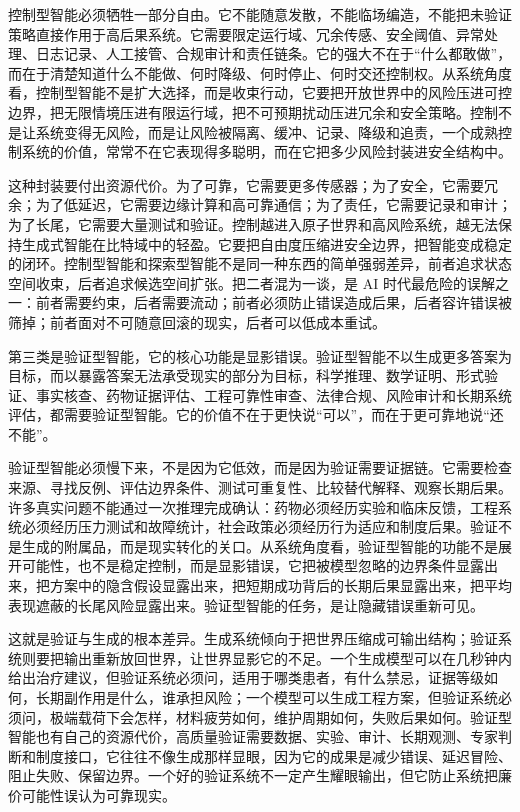 控制型智能必须牺牲一部分自由。它不能随意发散，不能临场编造，不能把未验证策略直接作用于高后果系统。它需要限定运行域、冗余传感、安全阈值、异常处理、日志记录、人工接管、合规审计和责任链条。它的强大不在于“什么都敢做”，而在于清楚知道什么不能做、何时降级、何时停止、何时交还控制权。从系统角度看，控制型智能不是扩大选择，而是收束行动，它要把开放世界中的风险压进可控边界，把无限情境压进有限运行域，把不可预期扰动压进冗余和安全策略。控制不是让系统变得无风险，而是让风险被隔离、缓冲、记录、降级和追责，一个成熟控制系统的价值，常常不在它表现得多聪明，而在它把多少风险封装进安全结构中。

这种封装要付出资源代价。为了可靠，它需要更多传感器；为了安全，它需要冗余；为了低延迟，它需要边缘计算和高可靠通信；为了责任，它需要记录和审计；为了长尾，它需要大量测试和验证。控制越进入原子世界和高风险系统，越无法保持生成式智能在比特域中的轻盈。它要把自由度压缩进安全边界，把智能变成稳定的闭环。控制型智能和探索型智能不是同一种东西的简单强弱差异，前者追求状态空间收束，后者追求候选空间扩张。把二者混为一谈，是 AI 时代最危险的误解之一：前者需要约束，后者需要流动；前者必须防止错误造成后果，后者容许错误被筛掉；前者面对不可随意回滚的现实，后者可以低成本重试。


第三类是验证型智能，它的核心功能是显影错误。验证型智能不以生成更多答案为目标，而以暴露答案无法承受现实的部分为目标，科学推理、数学证明、形式验证、事实核查、药物证据评估、工程可靠性审查、法律合规、风险审计和长期系统评估，都需要验证型智能。它的价值不在于更快说“可以”，而在于更可靠地说“还不能”。

验证型智能必须慢下来，不是因为它低效，而是因为验证需要证据链。它需要检查来源、寻找反例、评估边界条件、测试可重复性、比较替代解释、观察长期后果。许多真实问题不能通过一次推理完成确认：药物必须经历实验和临床反馈，工程系统必须经历压力测试和故障统计，社会政策必须经历行为适应和制度后果。验证不是生成的附属品，而是现实转化的关口。从系统角度看，验证型智能的功能不是展开可能性，也不是稳定控制，而是显影错误，它把被模型忽略的边界条件显露出来，把方案中的隐含假设显露出来，把短期成功背后的长期后果显露出来，把平均表现遮蔽的长尾风险显露出来。验证型智能的任务，是让隐藏错误重新可见。

这就是验证与生成的根本差异。生成系统倾向于把世界压缩成可输出结构；验证系统则要把输出重新放回世界，让世界显影它的不足。一个生成模型可以在几秒钟内给出治疗建议，但验证系统必须问，适用于哪类患者，有什么禁忌，证据等级如何，长期副作用是什么，谁承担风险；一个模型可以生成工程方案，但验证系统必须问，极端载荷下会怎样，材料疲劳如何，维护周期如何，失败后果如何。验证型智能也有自己的资源代价，高质量验证需要数据、实验、审计、长期观测、专家判断和制度接口，它往往不像生成那样显眼，因为它的成果是减少错误、延迟冒险、阻止失败、保留边界。一个好的验证系统不一定产生耀眼输出，但它防止系统把廉价可能性误认为可靠现实。

